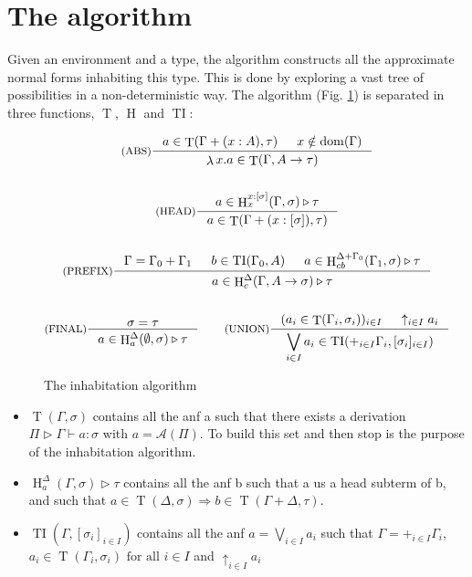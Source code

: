 \documentclass{article}
\DeclareMathOperator{\iT}{T}
\DeclareMathOperator{\iH}{H}
\DeclareMathOperator{\iTI}{TI}
\DeclareMathOperator{\iDom}{dom}
\DeclareMathOperator{\iLambda}{\lambda}
\begin{document}
\section{The algorithm}
Given an environment and a type, the algorithm constructs all the approximate normal forms inhabiting this type. This is done by exploring a vast tree of possibilities in a non-deterministic way. The algorithm (Fig. \ref{INH}) is separated in three functions, $\iT$, $\iH$ and $\iTI$:
\begin{figure}[h]
    \begin{mdframed}
        \begin{gather*}
            \inference[(ABS)]{a \in \iT(\Gamma + (x : A), \tau) & x \notin \iDom(\Gamma)}{\iLambda x.a \in \iT(\Gamma, A \rightarrow \tau)}
            \\ \\
            \inference[(HEAD)]{a \in \iH^{x:[\sigma]}_x(\Gamma, \sigma) \triangleright \tau}{a \in\iT(\Gamma + (x:[\sigma]), \tau) }
            \\ \\
            \inference[(PREFIX)]{\Gamma = \Gamma_0 + \Gamma_1 & b \in \iTI(\Gamma_0, A) & a \in \iH^{\Delta + \Gamma_0}_{cb}(\Gamma_1, \sigma) \triangleright \tau}{a \in \iH^{\Delta}_c(\Gamma, A \rightarrow \sigma) \triangleright \tau}
            \\ \\
            \inference[(FINAL)]{\sigma = \tau}{a \in \iH^{\Delta}_a(\emptyset, \sigma) \triangleright \tau}
            \qquad
            \inference[(UNION)]{(a_i \in \iT(\Gamma_i, \sigma_i))_{i \in I} & \uparrow_{i \in I}a_i}{\displaystyle \bigvee_{i \in I} a_i \in \iTI(+_{i \in I}\Gamma_i, [\sigma_i]_{i \in I}) }
        \end{gather*}
    \end{mdframed}
  \caption{The inhabitation algorithm}
  \label{INH}
\end{figure}
\begin{itemize}
\item $\iT(\Gamma, \sigma)$ contains all the anf a such that there exists a derivation $\Pi \triangleright \Gamma \vdash a : \sigma$ with $a = \mathcal{A}(\Pi)$. To build this set and then stop is the purpose of the inhabitation algorithm.
\item $\iH^\Delta_a(\Gamma, \sigma) \triangleright \tau$ contains all the anf b such that a us a head subterm of b, and such that $a \in \iT(\Delta, \sigma) \Rightarrow b \in \iT(\Gamma + \Delta, \tau)$.
\item $\iTI(\Gamma, [\sigma_i]_{i \in I})$ contains all the anf $a = \bigvee_{i\in I}a_i$ such that $ \Gamma = +_{i \in I} \Gamma_i $, $ a_i \in \iT(\Gamma_i, \sigma_i)\text{ for all }i \in I $ and $\uparrow_{i \in I}a_i$
\end{itemize}
\end{document}
